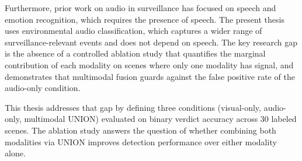 Furthermore, prior work on audio in surveillance has focused on speech and emotion recognition, which requires the presence of speech. The present thesis uses environmental audio classification, which captures a wider range of surveillance-relevant events and does not depend on speech. The key research gap is the absence of a controlled ablation study that quantifies the marginal contribution of each modality on scenes where only one modality has signal, and demonstrates that multimodal fusion guards against the false positive rate of the audio-only condition.

This thesis addresses that gap by defining three conditions (visual-only, audio-only, multimodal UNION) evaluated on binary verdict accuracy across 30 labeled scenes. The ablation study answers the question of whether combining both modalities via UNION improves detection performance over either modality alone.
